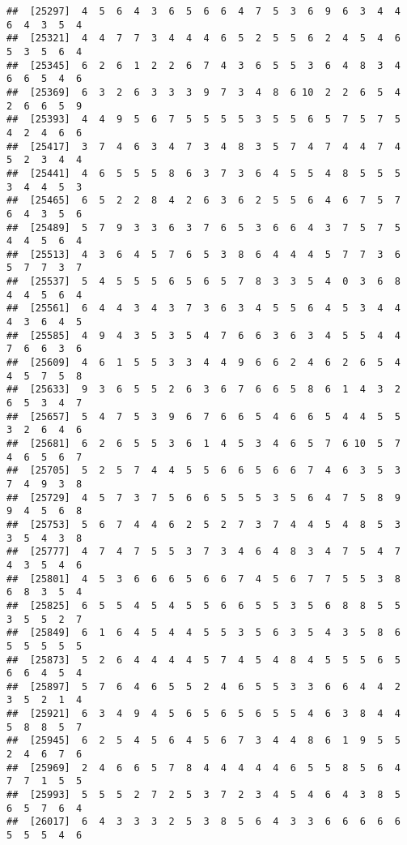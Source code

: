 \documentclass[
]{book}
\begin{document}
\begin{verbatim}
##  [25297]  4  5  6  4  3  6  5  6  6  4  7  5  3  6  9  6  3  4  4  6  4  3  5  4
##  [25321]  4  4  7  7  3  4  4  4  6  5  2  5  5  6  2  4  5  4  6  5  3  5  6  4
##  [25345]  6  2  6  1  2  2  6  7  4  3  6  5  5  3  6  4  8  3  4  6  6  5  4  6
##  [25369]  6  3  2  6  3  3  3  9  7  3  4  8  6 10  2  2  6  5  4  2  6  6  5  9
##  [25393]  4  4  9  5  6  7  5  5  5  5  3  5  5  6  5  7  5  7  5  4  2  4  6  6
##  [25417]  3  7  4  6  3  4  7  3  4  8  3  5  7  4  7  4  4  7  4  5  2  3  4  4
##  [25441]  4  6  5  5  5  8  6  3  7  3  6  4  5  5  4  8  5  5  5  3  4  4  5  3
##  [25465]  6  5  2  2  8  4  2  6  3  6  2  5  5  6  4  6  7  5  7  6  4  3  5  6
##  [25489]  5  7  9  3  3  6  3  7  6  5  3  6  6  4  3  7  5  7  5  4  4  5  6  4
##  [25513]  4  3  6  4  5  7  6  5  3  8  6  4  4  4  5  7  7  3  6  5  7  7  3  7
##  [25537]  5  4  5  5  5  6  5  6  5  7  8  3  3  5  4  0  3  6  8  4  4  5  6  4
##  [25561]  6  4  4  3  4  3  7  3  6  3  4  5  5  6  4  5  3  4  4  4  3  6  4  5
##  [25585]  4  9  4  3  5  3  5  4  7  6  6  3  6  3  4  5  5  4  4  7  6  6  3  6
##  [25609]  4  6  1  5  5  3  3  4  4  9  6  6  2  4  6  2  6  5  4  4  5  7  5  8
##  [25633]  9  3  6  5  5  2  6  3  6  7  6  6  5  8  6  1  4  3  2  6  5  3  4  7
##  [25657]  5  4  7  5  3  9  6  7  6  6  5  4  6  6  5  4  4  5  5  3  2  6  4  6
##  [25681]  6  2  6  5  5  3  6  1  4  5  3  4  6  5  7  6 10  5  7  4  6  5  6  7
##  [25705]  5  2  5  7  4  4  5  5  6  6  5  6  6  7  4  6  3  5  3  7  4  9  3  8
##  [25729]  4  5  7  3  7  5  6  6  5  5  5  3  5  6  4  7  5  8  9  9  4  5  6  8
##  [25753]  5  6  7  4  4  6  2  5  2  7  3  7  4  4  5  4  8  5  3  3  5  4  3  8
##  [25777]  4  7  4  7  5  5  3  7  3  4  6  4  8  3  4  7  5  4  7  4  3  5  4  6
##  [25801]  4  5  3  6  6  6  5  6  6  7  4  5  6  7  7  5  5  3  8  6  8  3  5  4
##  [25825]  6  5  5  4  5  4  5  5  6  6  5  5  3  5  6  8  8  5  5  3  5  5  2  7
##  [25849]  6  1  6  4  5  4  4  5  5  3  5  6  3  5  4  3  5  8  6  5  5  5  5  5
##  [25873]  5  2  6  4  4  4  4  5  7  4  5  4  8  4  5  5  5  6  5  6  6  4  5  4
##  [25897]  5  7  6  4  6  5  5  2  4  6  5  5  3  3  6  6  4  4  2  3  5  2  1  4
##  [25921]  6  3  4  9  4  5  6  5  6  5  6  5  5  4  6  3  8  4  4  5  8  8  5  7
##  [25945]  6  2  5  4  5  6  4  5  6  7  3  4  4  8  6  1  9  5  5  2  4  6  7  6
##  [25969]  2  4  6  6  5  7  8  4  4  4  4  4  6  5  5  8  5  6  4  7  7  1  5  5
##  [25993]  5  5  5  2  7  2  5  3  7  2  3  4  5  4  6  4  3  8  5  6  5  7  6  4
##  [26017]  6  4  3  3  3  2  5  3  8  5  6  4  3  3  6  6  6  6  6  5  5  5  4  6

\end{verbatim}
\end{document}

